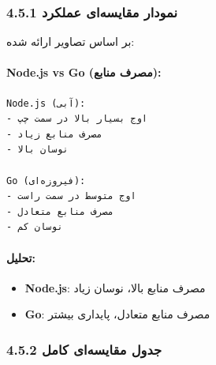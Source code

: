 \documentclass[
]{article}
\providecommand{\tightlist}{%
  \setlength{\itemsep}{0pt}\setlength{\parskip}{0pt}}
\begin{document}
\subsubsection{4.5.1 نمودار مقایسه‌ای
عملکرد}\label{ux646ux645ux648ux62fux627ux631-ux645ux642ux627ux6ccux633ux647ux627ux6cc-ux639ux645ux644ux6a9ux631ux62f}

بر اساس تصاویر ارائه شده:

\paragraph{Node.js vs Go (مصرف
منابع):}\label{node.js-vs-go-ux645ux635ux631ux641-ux645ux646ux627ux628ux639}

\begin{verbatim}
Node.js (آبی):
- اوج بسیار بالا در سمت چپ
- مصرف منابع زیاد
- نوسان بالا

Go (فیروزه‌ای):
- اوج متوسط در سمت راست
- مصرف منابع متعادل
- نوسان کم
\end{verbatim}

\paragraph{تحلیل:}\label{ux62aux62dux644ux6ccux644-6}

\begin{itemize}
\tightlist
\item
  \textbf{Node.js}: مصرف منابع بالا، نوسان زیاد
\item
  \textbf{Go}: مصرف منابع متعادل، پایداری بیشتر
\end{itemize}

\subsubsection{4.5.2 جدول مقایسه‌ای
کامل}\label{ux62cux62fux648ux644-ux645ux642ux627ux6ccux633ux647ux627ux6cc-ux6a9ux627ux645ux644}
\end{document}
